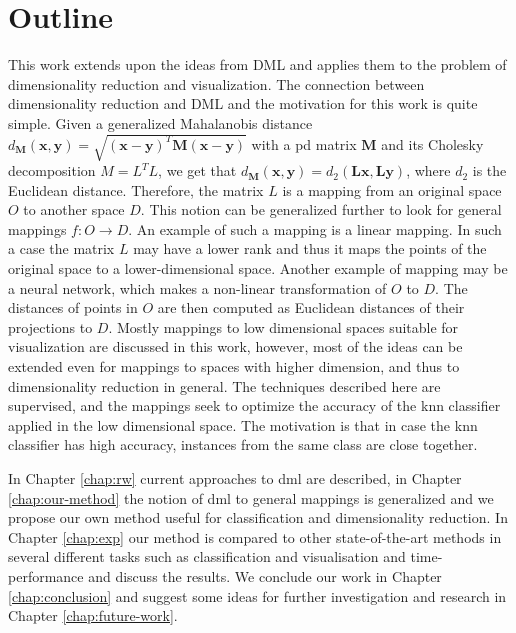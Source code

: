 \documentclass[12pt,a4paper]{report}
\begin{document}
\section{Outline}
This work extends upon the ideas from DML and applies them to the problem of dimensionality reduction and visualization. The connection between dimensionality reduction and DML and the motivation for this work is quite simple. Given a generalized Mahalanobis distance $d_{\bm{M}}(\textbf{x},\textbf{y}) = \sqrt{(\textbf{x}-\textbf{y})^{T}\bm{M}(\textbf{x}-\textbf{y})}$ with a \acl{pd} matrix $\bm{M}$ and its Cholesky decomposition $M=L^TL$, we get that $d_{\bm{M}}(\textbf{x},\textbf{y}) = d_{2}(\bm{L}\textbf{x},\bm{L}\textbf{y})$, where $d_2$ is the Euclidean distance. Therefore, the matrix $L$ is a mapping from an original space $O$ to another space $D$. This notion can be generalized further to look for general mappings $f: O \to D$. An example of such a mapping is a linear mapping. In such a case the matrix $L$ may have a lower rank and thus it maps the points of the original space to a lower-dimensional space. Another example of mapping may be a neural network, which makes a non-linear transformation of $O$ to $D$. The distances of points in $O$ are then computed as Euclidean distances of their projections to $D$. Mostly mappings to low dimensional spaces suitable for visualization are discussed in this work, however, most of the ideas can be extended even for mappings to spaces with higher dimension, and thus to dimensionality reduction in general. The techniques described here are supervised, and the mappings seek to optimize the accuracy of the \ac{knn} classifier applied in the low dimensional space. The motivation is that in case the \ac{knn} classifier has high accuracy, instances from the same class are close together.

In Chapter \ref{chap:rw} current approaches to \acl{dml} are described, in Chapter \ref{chap:our-method} the notion of \ac{dml} to general mappings is generalized and we propose our own method useful for classification and dimensionality reduction. In Chapter \ref{chap:exp} our method is compared to other state-of-the-art methods in several different tasks such as classification and visualisation and time-performance and discuss the results. We conclude our work in Chapter \ref{chap:conclusion} and suggest some ideas for further investigation and research in Chapter \ref{chap:future-work}.

\end{document}
